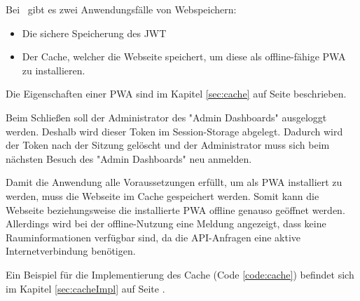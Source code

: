 
Bei \ZELIA\ gibt es zwei Anwendungsfälle von Webspeichern:

\begin{itemize}
    \item Die sichere Speicherung des JWT
    \item Der Cache, welcher die Webseite speichert, um diese als offline-fähige PWA zu installieren.
\end{itemize}

Die Eigenschaften einer PWA sind im Kapitel \ref{sec:cache} auf Seite \pageref{sec:cache} beschrieben.


Beim Schließen soll der Administrator des "Admin Dashboards" ausgeloggt werden. 
Deshalb wird dieser Token im Session-Storage abgelegt. 
Dadurch wird der Token nach der Sitzung gelöscht und der Administrator muss sich beim nächsten Besuch des "Admin Dashboards" neu anmelden.


Damit die Anwendung alle Voraussetzungen erfüllt, um als PWA installiert zu werden, muss die Webseite im Cache gespeichert werden. 
Somit kann die Webseite beziehungsweise die installierte PWA offline genauso geöffnet werden. 
Allerdings wird bei der offline-Nutzung eine Meldung angezeigt, dass keine Rauminformationen verfügbar sind, da die API-Anfragen eine aktive Internetverbindung benötigen.

Ein Beispiel für die Implementierung des Cache (Code \ref{code:cache}) befindet sich im Kapitel \ref{sec:cacheImpl} auf Seite \pageref{code:cache}.
 